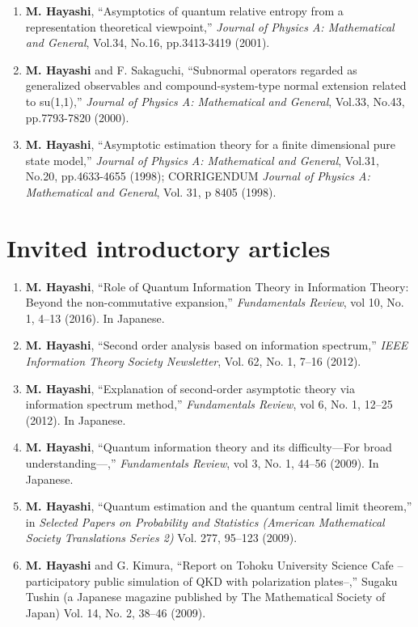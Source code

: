 \documentclass[a4paper,12pt,oneside]{article}
\begin{document}
\begin{enumerate}
\item
\textbf{M. Hayashi}, ``Asymptotics of quantum relative entropy from a representation theoretical viewpoint,'' 
{\em Journal of Physics A: Mathematical and General}, Vol.34, No.16, pp.3413-3419 (2001).

\item
\textbf{M. Hayashi} and F. Sakaguchi, ``Subnormal operators regarded as generalized observables and compound-system-type normal extension related to su(1,1),'' 
{\em Journal of Physics A: Mathematical and General}, Vol.33, No.43, pp.7793-7820 (2000).

\item
\textbf{M. Hayashi}, ``Asymptotic estimation theory for a finite dimensional pure state model,'' 
{\em Journal of Physics A: Mathematical and General}, Vol.31, No.20, pp.4633-4655 (1998); 
CORRIGENDUM {\em Journal of Physics A: Mathematical and General}, Vol. 31, p 8405 (1998).
\end{enumerate}

\section{Invited introductory articles}
\begin{enumerate}
\item 
\textbf{M. Hayashi},
``Role of Quantum Information Theory in Information Theory:
Beyond the non-commutative expansion,''
{\em Fundamentals Review}, vol 10, No. 1,  4--13 (2016). 
In Japanese. 


\item 
\textbf{M. Hayashi}, ``Second order analysis based on information spectrum,'' 
{\em IEEE Information Theory Society Newsletter}, Vol. 62, No. 1, 7--16 (2012). 

\item 
\textbf{M. Hayashi},
``Explanation of second-order asymptotic theory via information spectrum method,''
{\em Fundamentals Review}, vol 6, No. 1, 12--25 (2012). 
In Japanese. 

\item 
\textbf{M. Hayashi},
``Quantum information theory and its difficulty---For broad understanding---,''
{\em Fundamentals Review}, vol 3, No. 1, 44--56 (2009). 
In Japanese. 

\item 
\textbf{M. Hayashi}, 
``Quantum estimation and the quantum central limit theorem,'' 
in 
{\em Selected Papers on Probability and Statistics (American Mathematical Society Translations Series 2)} Vol. 277, 95--123 (2009). 

\item 
\textbf{M. Hayashi} and G. Kimura,
``Report on Tohoku University Science Cafe -- 
participatory public simulation of QKD with polarization plates--,'' 
Sugaku Tushin (a Japanese magazine published by The Mathematical Society of Japan)
Vol. 14, No. 2, 38--46 (2009).

\end{enumerate}
\end{document}
